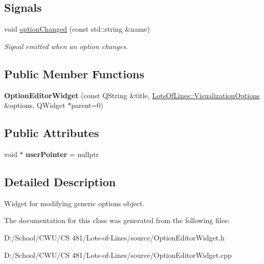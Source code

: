 \subsection*{Signals}
\begin{DoxyCompactItemize}
\item 
void \hyperlink{class_option_editor_widget_a5d20206fb9e29ea1e342d423d1a10eed}{option\+Changed} (const std\+::string \&name)\hypertarget{class_option_editor_widget_a5d20206fb9e29ea1e342d423d1a10eed}{}\label{class_option_editor_widget_a5d20206fb9e29ea1e342d423d1a10eed}

\begin{DoxyCompactList}\small\item\em Signal emitted when an option changes. \end{DoxyCompactList}\end{DoxyCompactItemize}
\subsection*{Public Member Functions}
\begin{DoxyCompactItemize}
\item 
{\bfseries Option\+Editor\+Widget} (const Q\+String \&title, \hyperlink{class_lots_of_lines_1_1_visualization_options}{Lots\+Of\+Lines\+::\+Visualization\+Options} \&options, Q\+Widget $\ast$parent=0)\hypertarget{class_option_editor_widget_ad4a9335b2399f860b13e925a7eff834d}{}\label{class_option_editor_widget_ad4a9335b2399f860b13e925a7eff834d}

\end{DoxyCompactItemize}
\subsection*{Public Attributes}
\begin{DoxyCompactItemize}
\item 
void $\ast$ {\bfseries user\+Pointer} = nullptr\hypertarget{class_option_editor_widget_ab6be94155c50503af258f0cc9da45c04}{}\label{class_option_editor_widget_ab6be94155c50503af258f0cc9da45c04}

\end{DoxyCompactItemize}


\subsection{Detailed Description}
Widget for modifying generic options object. 

The documentation for this class was generated from the following files\+:\begin{DoxyCompactItemize}
\item 
D\+:/\+School/\+C\+W\+U/\+C\+S 481/\+Lots-\/of-\/\+Lines/source/Option\+Editor\+Widget.\+h\item 
D\+:/\+School/\+C\+W\+U/\+C\+S 481/\+Lots-\/of-\/\+Lines/source/Option\+Editor\+Widget.\+cpp\end{DoxyCompactItemize}
